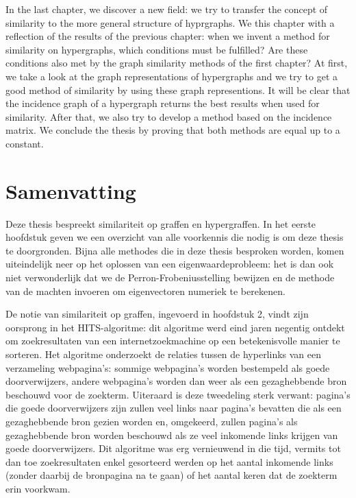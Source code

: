 \documentclass[a4paper,11pt]{report}
\begin{document}
In the last chapter, we discover a new field: we try to transfer the concept of similarity to the more
general structure of hyprgraphs. We this chapter with a reflection of the results of the previous chapter:
when we invent a method for similarity on hypergraphs, which conditions must be fulfilled? Are these conditions
also met by the graph similarity methods of the first chapter? At first, we take a look at the graph 
representations of hypergraphs and we try to get a good method of similarity by 
using these graph representions. It will be clear that the incidence graph of a 
hypergraph returns the best results when used for similarity. After that, we 
also try to develop a method based on the incidence matrix. We conclude the 
thesis by proving that both methods are equal up to a constant.



\chapter*{Samenvatting}
Deze thesis bespreekt similariteit op graffen en hypergraffen. In het eerste 
hoofdstuk geven we een overzicht van alle voorkennis die nodig is om deze thesis 
te doorgronden. Bijna alle methodes die in deze thesis besproken worden, komen 
uiteindelijk neer op het oplossen van een eigenwaardeprobleem: het is dan ook 
niet verwonderlijk dat we de Perron-Frobeniusstelling bewijzen en de methode van 
de machten invoeren om eigenvectoren numeriek te berekenen.


De notie van 
similariteit op graffen, ingevoerd in hoofdstuk 2, vindt zijn oorsprong in het HITS-algoritme: dit algoritme 
werd eind jaren negentig ontdekt om zoekresultaten van een internetzoekmachine op een betekenisvolle manier 
te sorteren. Het algoritme onderzoekt de relaties tussen de hyperlinks van een verzameling webpagina's: sommige webpagina's worden 
bestempeld als goede doorverwijzers, andere webpagina's worden dan weer als een gezaghebbende bron beschouwd voor de zoekterm. 
Uiteraard is deze tweedeling sterk verwant: pagina's die goede doorverwijzers 
zijn zullen veel links naar pagina's bevatten die als een gezaghebbende bron 
gezien worden en, omgekeerd, zullen pagina's als gezaghebbende bron worden 
beschouwd als ze veel inkomende links krijgen van goede doorverwijzers. Dit 
algoritme was erg vernieuwend in die tijd, vermits tot dan toe zoekresultaten 
enkel gesorteerd werden op het aantal inkomende links (zonder daarbij de bronpagina na te gaan) 
of het aantal keren dat de zoekterm erin voorkwam.
\end{document}
